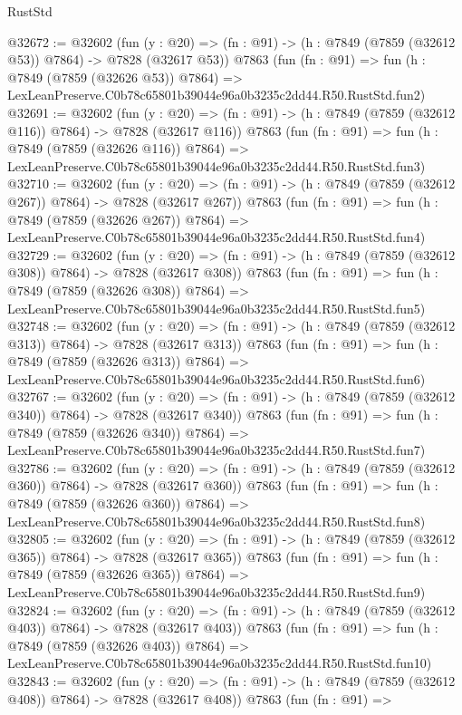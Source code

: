 \begin{lexlean}{RustStd}
\begin{coremodule}
@32672 := @32602
    (fun (y : @20) => (fn : @91) -> (h : @7849 (@7859 (@32612 @53)) @7864) -> @7828 (@32617 @53))
    @7863
    (fun (fn : @91) =>
    fun (h : @7849 (@7859 (@32626 @53)) @7864) =>
    LexLeanPreserve.C0b78c65801b39044e96a0b3235c2dd44.R50.RustStd.fun2)
@32691 := @32602
    (fun (y : @20) => (fn : @91) -> (h : @7849 (@7859 (@32612 @116)) @7864) -> @7828 (@32617 @116))
    @7863
    (fun (fn : @91) =>
    fun (h : @7849 (@7859 (@32626 @116)) @7864) =>
    LexLeanPreserve.C0b78c65801b39044e96a0b3235c2dd44.R50.RustStd.fun3)
@32710 := @32602
    (fun (y : @20) => (fn : @91) -> (h : @7849 (@7859 (@32612 @267)) @7864) -> @7828 (@32617 @267))
    @7863
    (fun (fn : @91) =>
    fun (h : @7849 (@7859 (@32626 @267)) @7864) =>
    LexLeanPreserve.C0b78c65801b39044e96a0b3235c2dd44.R50.RustStd.fun4)
@32729 := @32602
    (fun (y : @20) => (fn : @91) -> (h : @7849 (@7859 (@32612 @308)) @7864) -> @7828 (@32617 @308))
    @7863
    (fun (fn : @91) =>
    fun (h : @7849 (@7859 (@32626 @308)) @7864) =>
    LexLeanPreserve.C0b78c65801b39044e96a0b3235c2dd44.R50.RustStd.fun5)
@32748 := @32602
    (fun (y : @20) => (fn : @91) -> (h : @7849 (@7859 (@32612 @313)) @7864) -> @7828 (@32617 @313))
    @7863
    (fun (fn : @91) =>
    fun (h : @7849 (@7859 (@32626 @313)) @7864) =>
    LexLeanPreserve.C0b78c65801b39044e96a0b3235c2dd44.R50.RustStd.fun6)
@32767 := @32602
    (fun (y : @20) => (fn : @91) -> (h : @7849 (@7859 (@32612 @340)) @7864) -> @7828 (@32617 @340))
    @7863
    (fun (fn : @91) =>
    fun (h : @7849 (@7859 (@32626 @340)) @7864) =>
    LexLeanPreserve.C0b78c65801b39044e96a0b3235c2dd44.R50.RustStd.fun7)
@32786 := @32602
    (fun (y : @20) => (fn : @91) -> (h : @7849 (@7859 (@32612 @360)) @7864) -> @7828 (@32617 @360))
    @7863
    (fun (fn : @91) =>
    fun (h : @7849 (@7859 (@32626 @360)) @7864) =>
    LexLeanPreserve.C0b78c65801b39044e96a0b3235c2dd44.R50.RustStd.fun8)
@32805 := @32602
    (fun (y : @20) => (fn : @91) -> (h : @7849 (@7859 (@32612 @365)) @7864) -> @7828 (@32617 @365))
    @7863
    (fun (fn : @91) =>
    fun (h : @7849 (@7859 (@32626 @365)) @7864) =>
    LexLeanPreserve.C0b78c65801b39044e96a0b3235c2dd44.R50.RustStd.fun9)
@32824 := @32602
    (fun (y : @20) => (fn : @91) -> (h : @7849 (@7859 (@32612 @403)) @7864) -> @7828 (@32617 @403))
    @7863
    (fun (fn : @91) =>
    fun (h : @7849 (@7859 (@32626 @403)) @7864) =>
    LexLeanPreserve.C0b78c65801b39044e96a0b3235c2dd44.R50.RustStd.fun10)
@32843 := @32602
    (fun (y : @20) => (fn : @91) -> (h : @7849 (@7859 (@32612 @408)) @7864) -> @7828 (@32617 @408))
    @7863
    (fun (fn : @91) =>

\end{coremodule}
\end{lexlean}
